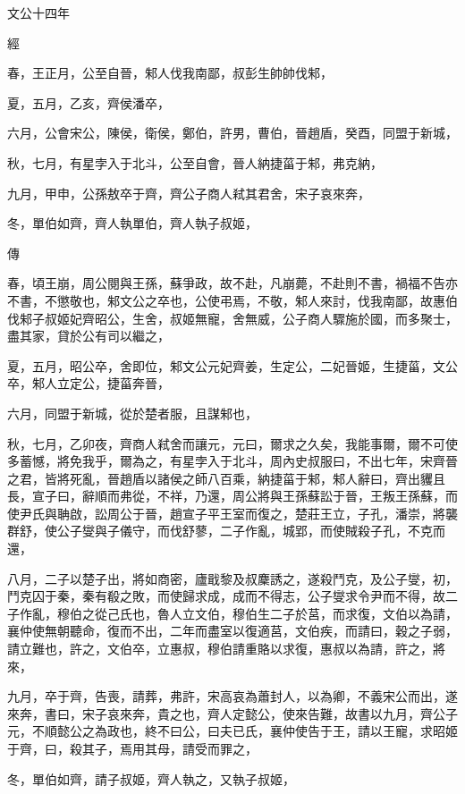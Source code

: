 \documentclass{ctexart}
\begin{document}
文公十四年


經



春，王正月，公至自晉，邾人伐我南鄙，叔彭生帥帥伐邾，

夏，五月，乙亥，齊侯潘卒，

六月，公會宋公，陳侯，衛侯，鄭伯，許男，曹伯，晉趙盾，癸酉，同盟于新城，

秋，七月，有星孛入于北斗，公至自會，晉人納捷菑于邾，弗克納，

九月，甲申，公孫敖卒于齊，齊公子商人弒其君舍，宋子哀來奔，

冬，單伯如齊，齊人執單伯，齊人執子叔姬，

傳



春，頃王崩，周公閱與王孫，蘇爭政，故不赴，凡崩薨，不赴則不書，禍福不告亦不書，不懲敬也，邾文公之卒也，公使弔焉，不敬，邾人來討，伐我南鄙，故惠伯伐邾子叔姬妃齊昭公，生舍，叔姬無寵，舍無威，公子商人驟施於國，而多聚士，盡其家，貸於公有司以繼之，

夏，五月，昭公卒，舍即位，邾文公元妃齊姜，生定公，二妃晉姬，生捷菑，文公卒，邾人立定公，捷菑奔晉，

六月，同盟于新城，從於楚者服，且謀邾也，

秋，七月，乙卯夜，齊商人弒舍而讓元，元曰，爾求之久矣，我能事爾，爾不可使多蓄憾，將免我乎，爾為之，有星孛入于北斗，周內史叔服曰，不出七年，宋齊晉之君，皆將死亂，晉趙盾以諸侯之師八百乘，納捷菑于邾，邾人辭曰，齊出貜且長，宣子曰，辭順而弗從，不祥，乃還，周公將與王孫蘇訟于晉，王叛王孫蘇，而使尹氏與聃啟，訟周公于晉，趙宣子平王室而復之，楚莊王立，子孔，潘崇，將襲群舒，使公子燮與子儀守，而伐舒蓼，二子作亂，城郢，而使賊殺子孔，不克而還，

八月，二子以楚子出，將如商密，廬戢黎及叔麇誘之，遂殺鬥克，及公子燮，初，鬥克囚于秦，秦有殽之敗，而使歸求成，成而不得志，公子燮求令尹而不得，故二子作亂，穆伯之從己氏也，魯人立文伯，穆伯生二子於莒，而求復，文伯以為請，襄仲使無朝聽命，復而不出，二年而盡室以復適莒，文伯疾，而請曰，穀之子弱，請立難也，許之，文伯卒，立惠叔，穆伯請重賂以求復，惠叔以為請，許之，將來，

九月，卒于齊，告喪，請葬，弗許，宋高哀為蕭封人，以為卿，不義宋公而出，遂來奔，書曰，宋子哀來奔，貴之也，齊人定懿公，使來告難，故書以九月，齊公子元，不順懿公之為政也，終不曰公，曰夫已氏，襄仲使告于王，請以王寵，求昭姬于齊，曰，殺其子，焉用其母，請受而罪之，

冬，單伯如齊，請子叔姬，齊人執之，又執子叔姬，
\end{document}
